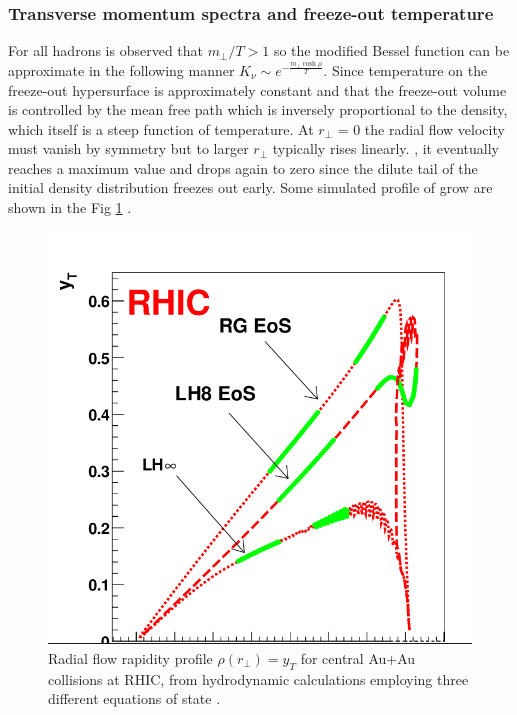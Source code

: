 \documentclass[12pt,a4paper]{book}
\begin{document}
	
	\subsubsection{Transverse momentum spectra and freeze-out temperature}
	For all hadrons is observed that $m_\perp/T >1$ so the modified Bessel function can be approximate in the following manner $K_\nu \sim e^{- \frac{m_\perp \cosh \rho}{T}}$. Since  temperature on the freeze-out hypersurface is approximately constant and that the freeze-out volume is controlled by the mean free path which is inversely proportional to the density, which itself is a steep function of temperature. At $r_\perp$ = 0 the radial flow velocity must vanish by symmetry but to larger $r_\perp$ typically rises	linearly. , it eventually reaches a maximum value and drops again to zero since the dilute tail of the initial density distribution freezes out early. Some simulated profile of grow are shown in the Fig \ref{fig:radial_flow} \cite{teaney2001hydrodynamicdescriptionheavyion}.
	
	\begin{figure}[ht]
		\centering
		\includegraphics[width=0.6\linewidth]{pictures/radial_flow.png}
		\caption{Radial flow rapidity profile $\rho(r_\perp)= y_T$ for central Au+Au collisions at RHIC, from hydrodynamic calculations employing three different equations of state \cite{EvolutionofcollisionsandQGP}.}
		\label{fig:radial_flow} 
	\end{figure}
	
\end{document}
